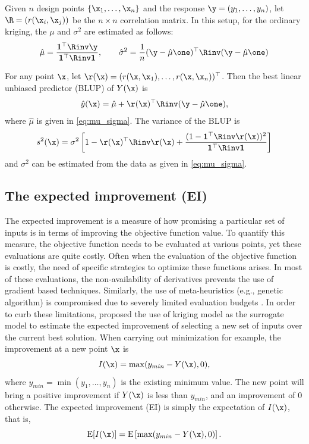 \documentclass [PhD] {package/uclathes}
\begin{document}
Given $n$ design points $\{\x_1, \ldots, \x_n\}$ and the response $\y=(y_1, \ldots, y_n)$,  let $\R=(r(\x_i, \x_j))$ be the $n \times n$ correlation matrix.
In this setup, for the ordinary kriging, the $\mu$ and $\sigma^2$ are estimated as follows:
\begin{equation} \label{eq:mu_sigma}
\hat\mu = \frac{\mathbf{1}^\top \Rinv \y}{\mathbf{1}^\top \Rinv \mathbf{1}},\quad\quad\hat\sigma^2 = \frac{1}{n}(\y-\hat\mu \one)^\top \Rinv(\y-\hat\mu \one)
\end{equation}

 For any point $\x$, let $\r(\x)=(r(\x, \x_1), \ldots, r(\x, \x_n))^\top$. Then the best linear unbiased predictor (BLUP) of $Y(\x)$  is
\begin{equation} \label{eq:yhat}
\hat y(\x) = \hat\mu  + \r(\x)^\top \Rinv(\y - \hat\mu \one),
\end{equation}
where \(\hat\mu\) is given in \eqref{eq:mu_sigma}.
The variance of the BLUP is
\begin{equation} \label{eq:s2}
s^2 (\x) = \sigma^2 \left[1 - \r(\x)^\top \Rinv \r(\x) + \frac{(1 - \mathbf{1}^\top \Rinv \r(\x))^2}{\mathbf{1}^\top\Rinv\mathbf{1}} \right]
\end{equation}
and $\sigma^2$ can be estimated from the data as given in \eqref{eq:mu_sigma}.

\subsection{The expected improvement (EI)}
The expected improvement is a measure of how promising a particular set of inputs is in terms of improving the objective function value. To quantify this measure, the objective function needs to be evaluated at various points, yet these evaluations are quite costly. Often when the evaluation of the objective function is costly, the need of specific strategies to optimize these functions arises. In most of these evaluations, the non-availability of derivatives prevents the use of gradient based techniques. Similarly, the use of meta-heuristics (e.g., genetic algorithm) is compromised due to severely limited evaluation budgets \parencite{roustant2012dicekriging}.  In order to curb these limitations, \textcite{jones1998efficient} proposed the use of kriging model as the surrogate model to estimate the expected improvement of selecting a new set of inputs over the current best solution. When carrying out minimization for example, the improvement at a new point  $\x$ is
$$ I(\x)=\max(y_{min} - Y(\x), 0), $$
where $y_{min} = \min(y_1,\dots, y_n)$ is the existing minimum value. The new point will bring a positive improvement if $Y(\x)$ is less than $y_{min}$, and an improvement of 0 otherwise. %
The expected improvement (EI) is simply the expectation of $I(\x)$, that is,
$$
\mathrm{E}[I(\x)] = \mathrm{E}\left[\max(y_{min} - Y(\x), 0)\right] .
$$
\end{document}
